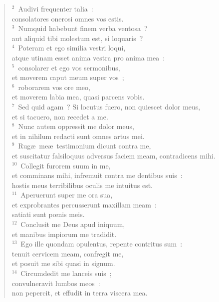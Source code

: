 \begin{flushleft}\begin{verse}\vspace{6pt}${}^{2}$~Audivi frequenter talia~:\\ consolatores onerosi omnes vos estis.\\
${}^{3}$~Numquid habebunt finem verba ventosa~?\\ aut aliquid tibi molestum est, si loquaris~?\\
${}^{4}$~Poteram et ego similia vestri loqui,\\ atque utinam esset anima vestra pro anima mea~:\\
${}^{5}$~consolarer et ego vos sermonibus,\\ et moverem caput meum super vos~;\\
${}^{6}$~roborarem vos ore meo,\\ et moverem labia mea, quasi parcens vobis.\\
${}^{7}$~Sed quid agam~? Si locutus fuero, non quiescet dolor meus,\\ et si tacuero, non recedet a me.\\
${}^{8}$~Nunc autem oppressit me dolor meus,\\ et in nihilum redacti sunt omnes artus mei.\\
${}^{9}$~Rug\ae\ me\ae\ testimonium dicunt contra me,\\ et suscitatur falsiloquus adversus faciem meam, contradicens mihi.\\
${}^{10}$~Collegit furorem suum in me,\\ et comminans mihi, infremuit contra me dentibus suis~:\\ hostis meus terribilibus oculis me intuitus est.\\
${}^{11}$~Aperuerunt super me ora sua,\\ et exprobrantes percusserunt maxillam meam~:\\ satiati sunt pœnis meis.\\
${}^{12}$~Conclusit me Deus apud iniquum,\\ et manibus impiorum me tradidit.\\
${}^{13}$~Ego ille quondam opulentus, repente contritus sum~:\\ tenuit cervicem meam, confregit me,\\ et posuit me sibi quasi in signum.\\
${}^{14}$~Circumdedit me lanceis suis~;\\ convulneravit lumbos meos~:\\ non pepercit, et effudit in terra viscera mea.\\

\end{verse}
\end{flushleft}

